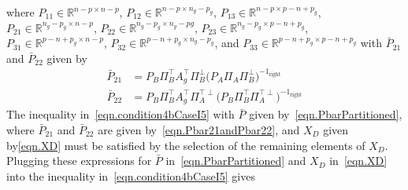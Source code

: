 where $P_{11}\in\mathbb{R}^{n-p \times n-p}$, $P_{12}\in\mathbb{R}^{n-p \times n_{g}-p_{g}}$, $P_{13}\in\mathbb{R}^{n-p \times p-n+p_{g}}$, $P_{21}\in\mathbb{R}^{n_{g}-p_{g} \times n-p}$, $P_{22}\in\mathbb{R}^{n_{g}-p_{g} \times n_{g}-p{g}}$, $P_{23}\in\mathbb{R}^{n_{g}-p_{g} \times p-n+p_{g}}$, $P_{31}\in\mathbb{R}^{p-n+p_{g} \times n-p}$, $P_{32}\in\mathbb{R}^{p-n+p_{g} \times n_{g}-p_{g}}$, and $P_{33}\in\mathbb{R}^{p-n+p_{g} \times p-n+p_{g}}$ with $\bar{P}_{21}$ and $\bar{P}_{22}$ given by
\begin{equation}
  \label{eqn.Pbar21andPbar22}
  \begin{split}
    \bar{P}_{21}
    &=
    P_{B}\Pi_{B}^{\top}A_{g}^{\top}\Pi_{B}^{\perp}
    \bigr(P_{A}\Pi_{A}\Pi_{B}^{\perp}\bigr)^{-1_{\text{right}}} \\
    \bar{P}_{22}
    &=
    P_{B}\Pi_{B}^{\top}A_{g}^{\top}\Pi_{A}^{\top\perp}\bigr(P_{B}\Pi_{B}^{\top}\Pi_{A}^{\top\perp}\bigr)^{-1_{\text{right}}}
  \end{split}
\end{equation}
The inequality in\ \eqref{eqn.condition4bCaseI5} with $\bar{P}$ given by\ \eqref{eqn.PbarPartitioned}, where $\bar{P}_{21}$ and $\bar{P}_{22}$ are given by\ \eqref{eqn.Pbar21andPbar22}, and $X_{D}$ given by\eqref{eqn.XD} must be satisfied by the selection of the remaining elements of $X_{D}$.
Plugging these expressions for $\bar{P}$ in\ \eqref{eqn.PbarPartitioned} and $X_{D}$ in\ \eqref{eqn.XD} into the inequality in\ \eqref{eqn.condition4bCaseI5} gives
